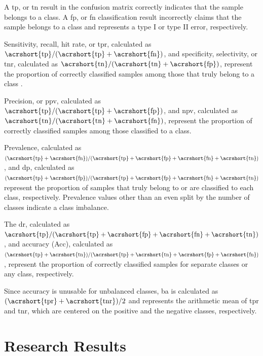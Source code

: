 \documentclass[sn-mathphys-num]{sn-jnl}%
\begin{document}
A \acrfull{tp}, or \acrfull{tn} result in the confusion matrix correctly indicates that the sample belongs to a class. A \acrfull{fp}, or \acrfull{fn} classification result incorrectly claims that the sample belongs to a class and represents a type I or type II error, respectively.

Sensitivity, recall, hit rate, or \acrfull{tpr}, calculated as $\mathrm{\acrshort{tp}}/(\mathrm{\acrshort{tp}}+\mathrm{\acrshort{fn}})$, and specificity, selectivity, or \acrfull{tnr}, calculated as $\mathrm{\acrshort{tn}}/(\mathrm{\acrshort{tn}}+\mathrm{\acrshort{fp}})$, represent the proportion of correctly classified samples among those that truly belong to a class \cite{altman1994diagnostic1, altman1994diagnostic2}.

Precision, or \acrfull{ppv}, calculated as $\mathrm{\acrshort{tp}}/(\mathrm{\acrshort{tp}}+\mathrm{\acrshort{fp}})$, and \acrfull{npv}, calculated as $\mathrm{\acrshort{tn}}/(\mathrm{\acrshort{tn}}+\mathrm{\acrshort{fn}})$, represent the proportion of correctly classified samples among those classified to a class.

Prevalence, calculated as $(\mathrm{\acrshort{tp}}+\mathrm{\acrshort{fn}})/(\mathrm{\acrshort{tp}}+\mathrm{\acrshort{fp}}+\mathrm{\acrshort{fn}}+\mathrm{\acrshort{tn}})$, and \acrfull{dp}, calculated as $(\mathrm{\acrshort{tp}}+\mathrm{\acrshort{fp}})/(\mathrm{\acrshort{tp}}+\mathrm{\acrshort{fp}}+\mathrm{\acrshort{fn}}+\mathrm{\acrshort{tn}})$ represent the proportion of samples that truly belong to or are classified to each class, respectively. Prevalence values other than an even split by the number of classes indicate a class imbalance.

The \acrfull{dr}, calculated as $\mathrm{\acrshort{tp}}/(\mathrm{\acrshort{tp}}+\mathrm{\acrshort{fp}}+\mathrm{\acrshort{fn}}+\mathrm{\acrshort{tn}})$, and accuracy (Acc), calculated as $(\mathrm{\acrshort{tp}} + \mathrm{\acrshort{tn}}) / (\mathrm{\acrshort{tp}} + \mathrm{\acrshort{tn}} + \mathrm{\acrshort{fp}} + \mathrm{\acrshort{fn}})$, represent the proportion of correctly classified samples for separate classes or any class, respectively.

Since accuracy is unusable for unbalanced classes, \acrfull{ba}  \cite{velez2007balanced} is calculated as $(\mathrm{\acrshort{tpr}} + \mathrm{\acrshort{tnr}}) / 2$ and represents the arithmetic mean of \acrshort{tpr} and \acrshort{tnr}, which are centered on the positive and the negative classes, respectively.

\section{Research Results}
\label{sec:Results}
\end{document}
